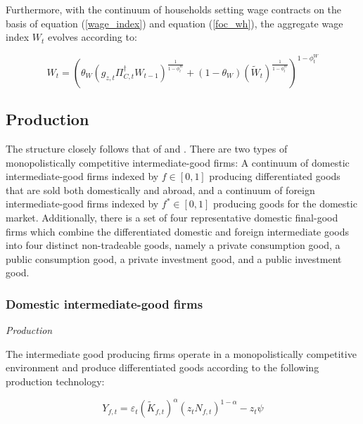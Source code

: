 \documentclass[a4paper,11pt]{article}
\numberwithin{equation}{section}
\begin{document}
	Furthermore, with the continuum of households setting wage contracts on the basis of equation (\ref{wage_index}) and equation (\ref{foc_wh}), the aggregate wage index $W_t$ evolves according to:
	
	\begin{equation} \label{agg_w}
	W_t=\left(\theta_W\left(g_{z,t}\Pi^{\dagger}_{C,t}W_{t-1}\right)^{\frac{1}{1-\phi_t^W}}+(1-\theta_W)\left(\widetilde{W}_t\right)^{\frac{1}{1-\phi_t^W}}\right)^{1-\phi_t^W}
	\end{equation}
	
	
	\subsection{Production}
	
	The structure closely follows that of \cite{christoffel2008} and \cite{coenen2013}. There are two types of monopolistically competitive intermediate-good firms: A continuum of domestic intermediate-good firms indexed by $f\in[0,1]$ producing differentiated goods that are sold both domestically and abroad, and a continuum of foreign intermediate-good firms indexed by $f^*\in[0,1]$ producing goods for the domestic market. Additionally, there is a set of four representative domestic final-good firms which combine the differentiated domestic and foreign intermediate goods into four distinct non-tradeable goods, namely a private consumption good, a public consumption good, a private investment good, and a public investment good.
	
	
	\subsubsection{Domestic intermediate-good firms}
	
	\textit{Production}
	\vspace{8pt}
	
	The intermediate good producing firms operate in a monopolistically competitive environment and produce differentiated goods according to the following production technology:
	
	\begin{equation} \label{prod_func}
	Y_{f,t}=\varepsilon_t\left(\tilde{K}_{f,t}\right)^\alpha\left(z_tN_{f,t}\right)^{1-\alpha}-z_t\psi
	\end{equation}
	
\end{document}
